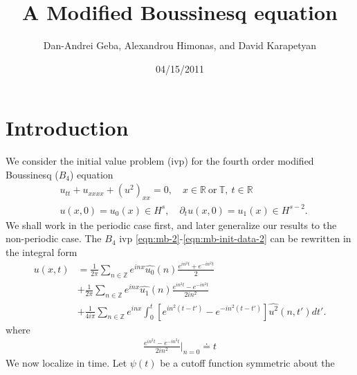 \documentclass[12pt,reqno]{amsart}
\numberwithin{equation}{section}  %
\newcommand{\rr}{\mathbb{R}}
\newcommand{\zz}{\mathbb{Z}}
\newcommand{\ci}{\mathbb{T}}
\newcommand{\wh}{\widehat}
\newcommand{\p}{\partial}
\begin{document}
\title{A Modified Boussinesq equation}
\author{Dan-Andrei Geba, Alexandrou Himonas, and David Karapetyan}
\address{Department of Mathematics, University of Rochester, Rochester, NY 14627}
\address{Department of Mathematics, University of Notre Dame, Notre Dame, IN 46556}
\address{Department of Mathematics, University of Notre Dame, Notre Dame, IN 46556}
\date{04/15/2011}
%
%
\maketitle
\tableofcontents
%
%
\section{Introduction}
%
%
%
We consider the initial value problem (ivp) for the fourth order modified Boussinesq
($B_4$) equation 
\begin{align}
  & u_{tt} + u_{xxxx} + (u^2)_{xx} = 0, \quad x \in \rr \ \text{or} \
  \ci, \ t \in \rr
  \label{eqn:mb-2}
  \\
  & u(x,0) = u_{0}(x) \in H^{s}, \quad \p_t u(x, 0) = u_1(x) \in H^{s-2}.
  \label{eqn:mb-init-data-2}
  \end{align}
%
%
We shall work in the periodic case first, and later generalize our results to
the non-periodic case. The $B_4$ ivp
\eqref{eqn:mb-2}-\eqref{eqn:mb-init-data-2} can be rewritten in the integral form
%
%
%
\begin{equation}
  \begin{split}
    u(x,t)
    & = \frac{1}{2\pi}\sum_{n \in \zz} e^{inx} \wh{u_{0}}(n) \frac{e^{in^{2}t} + e^{-in^{2}t}}{2} 
    \\
    & + \frac{1}{2 \pi}\sum_{n \in \zz} e^{inx}
    \wh{u_{1}}(n)\frac{e^{in^{2}t} - e^{-in^{2}t}}{2 i n^{2}} 
    \\
    & + \frac{1}{4 i \pi}\sum_{n \in \zz} e^{inx}
    \int_{0}^{t}[e^{in^{2}(t-t')}-e^{-in^{2}(t-t')}]
    \wh{u^{2}}(n, t') dt'.
  \end{split}
  \label{eqn:integral-form}
\end{equation}
%
where
%
%
\begin{equation*}
\begin{split}
  \frac{e^{in^{2}t} - e^{-in^{2}t}}{2 i n^{2}} \vert_{n=0} \doteq t 
\end{split}
\end{equation*}
%
%
We now localize in time. Let $\psi(t)$ be a cutoff function symmetric about the 
\end{document}
